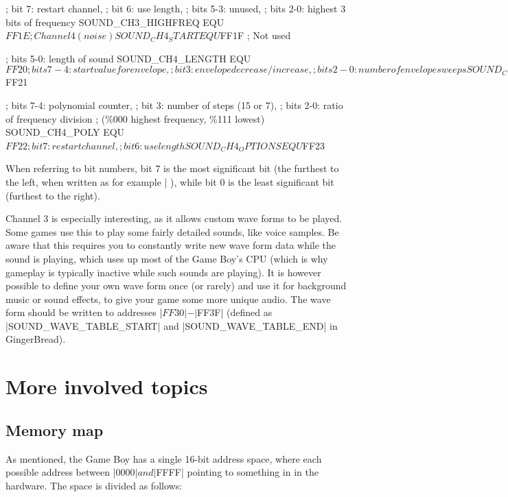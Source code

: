 \documentclass[11pt]{book}
\begin{document}
\begin{code}
; bit 7: restart channel, 
; bit 6: use length,
; bits 5-3: unused,
; bits 2-0: highest 3 bits of frequency
SOUND_CH3_HIGHFREQ  EQU $FF1E 

; Channel 4 (noise)
SOUND_CH4_START     EQU $FF1F ; Not used 

; bits 5-0: length of sound
SOUND_CH4_LENGTH    EQU $FF20

; bits 7-4: start value for envelope,
; bit 3: envelope decrease/increase,
; bits 2-0: number of envelope sweeps
SOUND_CH4_ENVELOPE  EQU $FF21 

; bits 7-4: polynomial counter, 
; bit 3: number of steps (15 or 7), 
; bits 2-0: ratio of frequency division 
; (\%000 highest frequency, \%111  lowest)
SOUND_CH4_POLY      EQU $FF22 

; bit 7: restart channel,
; bit 6: use length
SOUND_CH4_OPTIONS   EQU $FF23 

\end{code}

When referring to bit numbers, bit 7 is the most significant bit (the furthest to the left, when written as for example |%
), while bit 0 is the least significant bit (furthest to the right).

Channel 3 is especially interesting, as it allows custom wave forms to be played. Some games use this to play some fairly detailed sounds, like voice samples. Be aware that this requires you to constantly write new wave form data while the sound is playing, which uses up most of the Game Boy's CPU (which is why gameplay is typically inactive while such sounds are playing). It is however possible to define your own wave form once (or rarely) and use it for background music or sound effects, to give your game some more unique audio. The wave form should be written to addresses |$FF30|-|$FF3F| (defined as |SOUND_WAVE_TABLE_START| and |SOUND_WAVE_TABLE_END| in GingerBread).

\chapter{More involved topics}

\section{Memory map}
\label{memmap}
As mentioned, the Game Boy has a single 16-bit address space, where each possible address between |$0000| and |$FFFF| pointing to something in in the hardware. The space is divided as follows:
\end{document}
